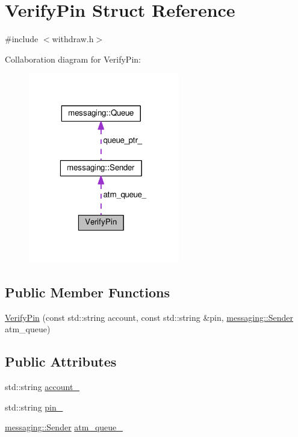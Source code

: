 \hypertarget{structVerifyPin}{\section{Verify\-Pin Struct Reference}
\label{structVerifyPin}
}


{\ttfamily \#include $<$withdraw.\-h$>$}



Collaboration diagram for Verify\-Pin\-:
\nopagebreak
\begin{figure}[H]
\begin{center}
\leavevmode
\includegraphics[width=187pt]{structVerifyPin__coll__graph}
\end{center}
\end{figure}
\subsection*{Public Member Functions}
\begin{DoxyCompactItemize}
\item 
\hyperlink{structVerifyPin_ac49a2deaf327f6582501ff5d9ea053cc}{Verify\-Pin} (const std\-::string account, const std\-::string \&pin, \hyperlink{classmessaging_1_1Sender}{messaging\-::\-Sender} atm\-\_\-queue)
\end{DoxyCompactItemize}
\subsection*{Public Attributes}
\begin{DoxyCompactItemize}
\item 
std\-::string \hyperlink{structVerifyPin_a0b4159b0183995de748fd55840e2de33}{account\-\_\-}
\item 
std\-::string \hyperlink{structVerifyPin_a5e8e9f664be63fe55500009d1b2b5a63}{pin\-\_\-}
\item 
\hyperlink{classmessaging_1_1Sender}{messaging\-::\-Sender} \hyperlink{structVerifyPin_a20cfdc37bb37447bb3036921c6f85100}{atm\-\_\-queue\-\_\-}
\end{DoxyCompactItemize}


